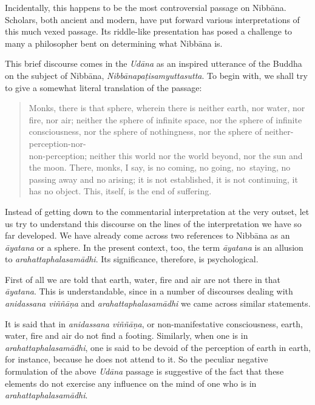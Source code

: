 Incidentally, this happens to be the most controversial passage on Nibbāna. Scholars, both ancient and modern, have put forward various interpretations of this much vexed passage. Its riddle-like presentation has posed a challenge to many a philosopher bent on determining what Nibbāna is.

This brief discourse comes in the \emph{Udāna} as an inspired utterance of the Buddha on the subject of Nibbāna, \emph{Nibbānapaṭisamyuttasutta}. To begin with, we shall try to give a somewhat literal translation of the passage:

\enlargethispage{\baselineskip}

\begin{quote}
Monks, there is that sphere, wherein there is neither earth, nor water, nor fire, nor air; neither the sphere of infinite space, nor the sphere of infinite consciousness, nor the sphere of nothingness, nor the sphere of neither-perception-nor-\\ non-perception; neither this world nor the world beyond, nor the sun and the moon. There, monks, I say, is no coming, no going, no~staying, no passing away and no arising; it is not established, it is not continuing, it has no object. This, itself, is the end of suffering.
\end{quote}

Instead of getting down to the commentarial interpretation at the very outset, let us try to understand this discourse on the lines of the interpretation we have so far developed. We have already come across two references to Nibbāna as an \emph{āyatana} or a sphere. In the present context, too, the term \emph{āyatana} is an allusion to \emph{arahattaphalasamādhi}. Its significance, therefore, is psychological.

First of all we are told that earth, water, fire and air are not there in that \emph{āyatana}. This is understandable, since in a number of discourses dealing with \emph{anidassana viññāṇa} and \emph{arahattaphalasamādhi} we came across similar statements.

It is said that in \emph{anidassana viññāṇa}, or non-manifestative consciousness, earth, water, fire and air do not find a footing. Similarly, when one is in \emph{arahattaphalasamādhi}, one is said to be devoid of the perception of earth in earth, for instance, because he does not attend to it. So the peculiar negative formulation of the above \emph{Udāna} passage is suggestive of the fact that these elements do not exercise any influence on the mind of one who is in \emph{arahattaphalasamādhi}.

